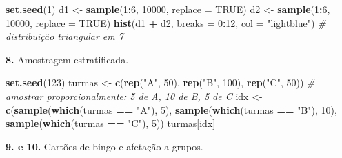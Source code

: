 \documentclass[
  portuguese,
  11pt,
  openany]{book}
\newenvironment{Shaded}{\begin{snugshade}}{\end{snugshade}}
\newcommand{\AttributeTok}[1]{\textcolor[rgb]{0.13,0.29,0.53}{#1}}
\newcommand{\CommentTok}[1]{\textcolor[rgb]{0.56,0.35,0.01}{\textit{#1}}}
\newcommand{\ConstantTok}[1]{\textcolor[rgb]{0.56,0.35,0.01}{#1}}
\newcommand{\DecValTok}[1]{\textcolor[rgb]{0.00,0.00,0.81}{#1}}
\newcommand{\FunctionTok}[1]{\textcolor[rgb]{0.13,0.29,0.53}{\textbf{#1}}}
\newcommand{\NormalTok}[1]{#1}
\newcommand{\OtherTok}[1]{\textcolor[rgb]{0.56,0.35,0.01}{#1}}
\newcommand{\SpecialCharTok}[1]{\textcolor[rgb]{0.81,0.36,0.00}{\textbf{#1}}}
\newcommand{\StringTok}[1]{\textcolor[rgb]{0.31,0.60,0.02}{#1}}
\begin{document}
\begin{Shaded}
\begin{Highlighting}[]
\FunctionTok{set.seed}\NormalTok{(}\DecValTok{1}\NormalTok{)}
\NormalTok{d1 }\OtherTok{\textless{}{-}} \FunctionTok{sample}\NormalTok{(}\DecValTok{1}\SpecialCharTok{:}\DecValTok{6}\NormalTok{, }\DecValTok{10000}\NormalTok{, }\AttributeTok{replace =} \ConstantTok{TRUE}\NormalTok{)}
\NormalTok{d2 }\OtherTok{\textless{}{-}} \FunctionTok{sample}\NormalTok{(}\DecValTok{1}\SpecialCharTok{:}\DecValTok{6}\NormalTok{, }\DecValTok{10000}\NormalTok{, }\AttributeTok{replace =} \ConstantTok{TRUE}\NormalTok{)}
\FunctionTok{hist}\NormalTok{(d1 }\SpecialCharTok{+}\NormalTok{ d2, }\AttributeTok{breaks =} \DecValTok{0}\SpecialCharTok{:}\DecValTok{12}\NormalTok{, }\AttributeTok{col =} \StringTok{"lightblue"}\NormalTok{)   }\CommentTok{\# distribuição triangular em 7}
\end{Highlighting}
\end{Shaded}

\textbf{8.} Amostragem estratificada.

\begin{Shaded}
\begin{Highlighting}[]
\FunctionTok{set.seed}\NormalTok{(}\DecValTok{123}\NormalTok{)}
\NormalTok{turmas }\OtherTok{\textless{}{-}} \FunctionTok{c}\NormalTok{(}\FunctionTok{rep}\NormalTok{(}\StringTok{"A"}\NormalTok{, }\DecValTok{50}\NormalTok{), }\FunctionTok{rep}\NormalTok{(}\StringTok{"B"}\NormalTok{, }\DecValTok{100}\NormalTok{), }\FunctionTok{rep}\NormalTok{(}\StringTok{"C"}\NormalTok{, }\DecValTok{50}\NormalTok{))}
\CommentTok{\# amostrar proporcionalmente: 5 de A, 10 de B, 5 de C}
\NormalTok{idx }\OtherTok{\textless{}{-}} \FunctionTok{c}\NormalTok{(}\FunctionTok{sample}\NormalTok{(}\FunctionTok{which}\NormalTok{(turmas }\SpecialCharTok{==} \StringTok{"A"}\NormalTok{), }\DecValTok{5}\NormalTok{),}
         \FunctionTok{sample}\NormalTok{(}\FunctionTok{which}\NormalTok{(turmas }\SpecialCharTok{==} \StringTok{"B"}\NormalTok{), }\DecValTok{10}\NormalTok{),}
         \FunctionTok{sample}\NormalTok{(}\FunctionTok{which}\NormalTok{(turmas }\SpecialCharTok{==} \StringTok{"C"}\NormalTok{), }\DecValTok{5}\NormalTok{))}
\NormalTok{turmas[idx]}
\end{Highlighting}
\end{Shaded}

\textbf{9. e 10.} Cartões de bingo e afetação a grupos.
\end{document}

